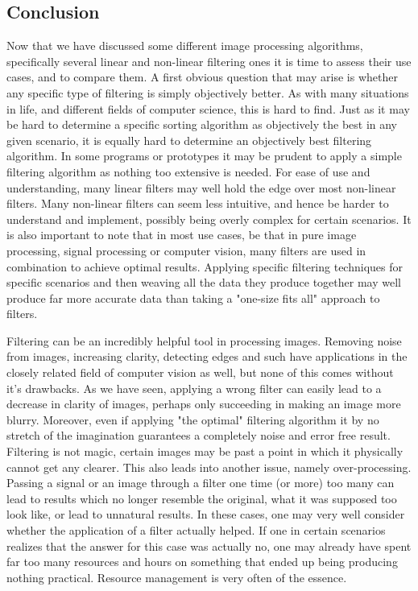 \documentclass[twoside,a4paper,article]{combine}
\begin{document}
\subsection{Conclusion}
Now that we have discussed some different image processing algorithms, specifically several linear and non-linear filtering ones it is time to assess their use cases, and to compare them. A first obvious question that may arise is whether any specific type of filtering is simply objectively better. As with many situations in life, and different fields of computer science, this is hard to find. Just as it may be hard to determine a specific sorting algorithm as objectively the best in any given scenario, it is equally hard to determine an objectively best filtering algorithm. In some programs or prototypes it may be prudent to apply a simple filtering algorithm as nothing too extensive is needed. For ease of use and understanding, many linear filters may well hold the edge over most non-linear filters. Many non-linear filters can seem less intuitive, and hence be harder to understand and implement, possibly being overly complex for certain scenarios. It is also important to note that in most use cases, be that in pure image processing, signal processing or computer vision, many filters are used in combination to achieve optimal results. Applying specific filtering techniques for specific scenarios and then weaving all the data they produce together may well produce far more accurate data than taking a "one-size fits all" approach to filters.

Filtering can be an incredibly helpful tool in processing images. Removing noise from images, increasing clarity, detecting edges and such have applications in the closely related field of computer vision as well, but none of this comes without it's drawbacks. As we have seen, applying a wrong filter can easily lead to a decrease in clarity of images, perhaps only succeeding in making an image more blurry. Moreover, even if applying "the optimal" filtering algorithm it by no stretch of the imagination guarantees a completely noise and error free result. Filtering is not magic, certain images may be past a point in which it physically cannot get any clearer. This also leads into another issue, namely over-processing. Passing a signal or an image through a filter one time (or more) too many can lead to results which no longer resemble the original, what it was supposed too look like, or lead to unnatural results. In these cases, one may very well consider whether the application of a filter actually helped. If one in certain scenarios realizes that the answer for this case was actually no, one may already have spent far too many resources and hours on something that ended up being producing nothing practical. Resource management is very often of the essence.
\end{document}
